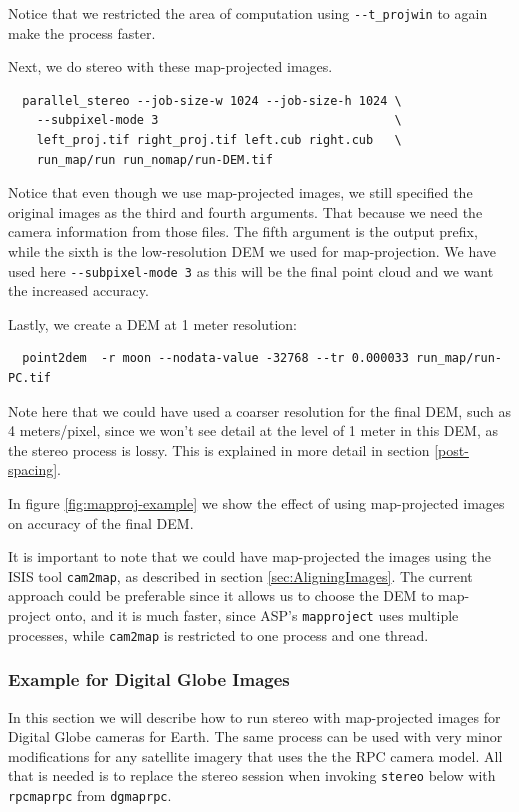 Notice that we restricted the area of computation using \texttt{-\/-t\_projwin}
to again make the process faster.

Next, we do stereo with these map-projected images.

\begin{verbatim}
  parallel_stereo --job-size-w 1024 --job-size-h 1024 \
    --subpixel-mode 3                                 \
    left_proj.tif right_proj.tif left.cub right.cub   \
    run_map/run run_nomap/run-DEM.tif
\end{verbatim}

Notice that even though we use map-projected images, we still specified
the original images as the third and fourth arguments. That because we
need the camera information from those files.  The fifth argument is
the output prefix, while the sixth is the low-resolution DEM we used for
map-projection. We have used here \texttt{-\/-subpixel-mode 3} as this
will be the final point cloud and we want the increased accuracy.

Lastly, we create a DEM at 1 meter resolution:
\begin{verbatim}
  point2dem  -r moon --nodata-value -32768 --tr 0.000033 run_map/run-PC.tif
\end{verbatim}
Note here that we could have used a coarser resolution for the final
DEM, such as 4 meters/pixel, since we won't see detail at the level of
1 meter in this DEM, as the stereo process is lossy. This is
explained in more detail in section \ref{post-spacing}.

In figure \ref{fig:mapproj-example} we show the effect of using
map-projected images on accuracy of the final DEM.

It is important to note that we could have map-projected the images
using the ISIS tool \texttt{cam2map}, as described in section
\ref{sec:AligningImages}. The current approach could be preferable since
it allows us to choose the DEM to map-project onto, and it is much faster,
since ASP's \texttt{mapproject} uses multiple processes, while \texttt{cam2map}
is restricted to one process and one thread.

\subsubsection{Example for Digital Globe Images}
\label{dg-mapproj}

In this section we will describe how to run stereo with map-projected
images for Digital Globe cameras for Earth. The same process can be used
with very minor modifications for any satellite imagery that uses the
the RPC camera model. All that is needed is to replace the stereo
session when invoking \texttt{stereo} below with \texttt{rpcmaprpc} from
\texttt{dgmaprpc}.

